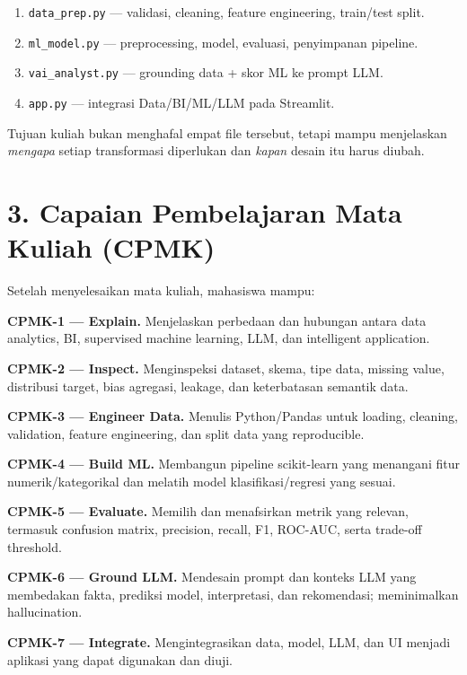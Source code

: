 \documentclass[
  indonesian,
  letterpaper,
  DIV=11,
  numbers=noendperiod]{scrreprt}
\providecommand{\tightlist}{%
  \setlength{\itemsep}{0pt}\setlength{\parskip}{0pt}}
\begin{document}
\begin{enumerate}
\def\labelenumi{\arabic{enumi}.}
\tightlist
\item
  \texttt{data\_prep.py} --- validasi, cleaning, feature engineering,
  train/test split.
\item
  \texttt{ml\_model.py} --- preprocessing, model, evaluasi, penyimpanan
  pipeline.
\item
  \texttt{vai\_analyst.py} --- grounding data + skor ML ke prompt LLM.
\item
  \texttt{app.py} --- integrasi Data/BI/ML/LLM pada Streamlit.
\end{enumerate}

Tujuan kuliah bukan menghafal empat file tersebut, tetapi mampu
menjelaskan \emph{mengapa} setiap transformasi diperlukan dan
\emph{kapan} desain itu harus diubah.


\chapter{3. Capaian Pembelajaran Mata Kuliah
(CPMK)}\label{capaian-pembelajaran-mata-kuliah-cpmk}

Setelah menyelesaikan mata kuliah, mahasiswa mampu:

\textbf{CPMK-1 --- Explain.} Menjelaskan perbedaan dan hubungan antara
data analytics, BI, supervised machine learning, LLM, dan intelligent
application.

\textbf{CPMK-2 --- Inspect.} Menginspeksi dataset, skema, tipe data,
missing value, distribusi target, bias agregasi, leakage, dan
keterbatasan semantik data.

\textbf{CPMK-3 --- Engineer Data.} Menulis Python/Pandas untuk loading,
cleaning, validation, feature engineering, dan split data yang
reproducible.

\textbf{CPMK-4 --- Build ML.} Membangun pipeline scikit-learn yang
menangani fitur numerik/kategorikal dan melatih model
klasifikasi/regresi yang sesuai.

\textbf{CPMK-5 --- Evaluate.} Memilih dan menafsirkan metrik yang
relevan, termasuk confusion matrix, precision, recall, F1, ROC-AUC,
serta trade-off threshold.

\textbf{CPMK-6 --- Ground LLM.} Mendesain prompt dan konteks LLM yang
membedakan fakta, prediksi model, interpretasi, dan rekomendasi;
meminimalkan hallucination.

\textbf{CPMK-7 --- Integrate.} Mengintegrasikan data, model, LLM, dan UI
menjadi aplikasi yang dapat digunakan dan diuji.
\end{document}
